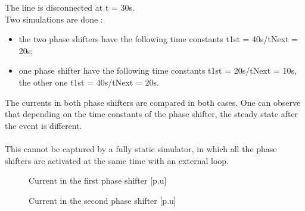 \documentclass[a4paper, 12pt]{report}
\begin{document}
The line is disconnected at t = 30s.\\
Two simulations are done :
\begin{itemize}
\item the two phase shifters have the following time constants t1st = 40s/tNext = 20s;
\item one phase shifter have the following time constants t1st = 20s/tNext = 10s, the other one t1st = 40s/tNext = 20s.
\end{itemize}

The currents in both phase shifters are compared in both cases. One can observe that depending on the time constants of the phase shifter, the steady state after the event is different.\\
\\
This cannot be captured by a fully static simulator, in which all the phase shifters are activated at the same time with an external loop.

\begin{figure}[H]
  \caption{Current in the first phase shifter [p.u]}
\end{figure}

\begin{figure}[H]
  \caption{Current in the second phase shifter [p.u]}
\end{figure}
\end{document}
